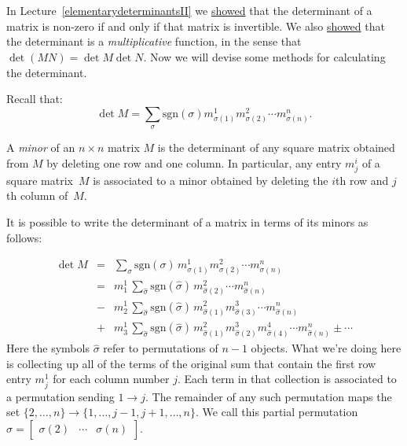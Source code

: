 
\chapter{\propDetTitle}

In Lecture~\ref{elementarydeterminantsII} we \hyperref[detinvertible]{showed} that the determinant of a matrix is non-zero if and only if that matrix is invertible.  We also \hyperref[detmultiplicative]{showed} that the determinant is a \emph{multiplicative} function, in the sense that $\det (MN)=\det M \det N$.  Now we will devise some methods for calculating the determinant.

Recall that:
\[
\det M = \sum_{\sigma} \text{sgn}(\sigma) m^1_{\sigma(1)}m^2_{\sigma(2)}\cdots m^n_{\sigma(n)}.
\]

A \emph{minor} of an $n\times n$ matrix $M$ is the determinant of any square matrix obtained from $M$ by deleting one row and one column.  In particular, any entry $m^i_j$ of a square matrix~$M$ is associated to a minor obtained by deleting the $i$th row and $j$th column of~$M$.

It is possible to write the determinant of a matrix in terms of  its minors as follows:

\begin{eqnarray*}
\det M &=& \sum_{\sigma} \text{sgn}(\sigma)\, m^1_{\sigma(1)}m^2_{\sigma(2)}\cdots m^n_{\sigma(n)} \\
&=& m^1_1\, \sum_{\hat{\sigma}} \text{sgn}(\hat{\sigma})\, m^2_{\hat{\sigma}(2)}\cdots m^n_{\hat{\sigma}(n)} \\
& -&  m^1_2\, \sum_{\hat{\sigma}} \text{sgn}(\hat{\sigma})\, m^2_{\hat{\sigma}(1)}m^3_{\hat{\sigma}(3)}\cdots m^n_{\hat{\sigma}(n)} \\
& +&  m^1_3\,  \sum_{\hat{\sigma}} \text{sgn}(\hat{\sigma})\, m^2_{\hat{\sigma}(1)}m^3_{\hat{\sigma}(2)}m^4_{\hat{\sigma}(4)}\cdots m^n_{\hat{\sigma}(n)} \pm \cdots
\end{eqnarray*}
Here the symbols $\hat{\sigma}$ refer to permutations of $n-1$ objects.  What we're doing here is collecting up all of the terms of the original sum that contain the first row entry $m^1_j$ for each column number $j$.  Each term in that collection is associated to a permutation sending $1\rightarrow j$.  The remainder of any such permutation maps the set $\{2, \ldots, n \}\rightarrow \{1, \ldots, j-1, j+1, \ldots, n \}$.  We call this partial permutation $\hat{\sigma}=\begin{bmatrix} \sigma(2) & \cdots & \sigma(n) \end{bmatrix}$.

